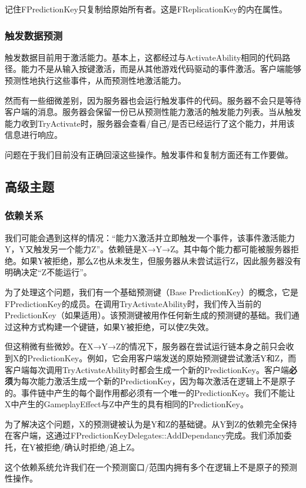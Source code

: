 \documentclass[10pt,CJKmath]{ctexart}
\begin{document}
记住FPredictionKey只复制给原始所有者。这是FReplicationKey的内在属性。

\subsubsection{触发数据预测}
触发数据目前用于激活能力。基本上，这都经过与ActivateAbility相同的代码路径。能力不是从输入按键激活，而是从其他游戏代码驱动的事件激活。客户端能够预测性地执行这些事件，从而预测性地激活能力。

然而有一些细微差别，因为服务器也会运行触发事件的代码。服务器不会只是等待客户端的消息。服务器会保留一份已从预测性能力激活的触发能力列表。当从触发能力收到TryActivate时，服务器会查看/自己/是否已经运行了这个能力，并用该信息进行响应。

问题在于我们目前没有正确回滚这些操作。触发事件和复制方面还有工作要做。

\subsection{高级主题}

\subsubsection{依赖关系}
我们可能会遇到这样的情况：“能力X激活并立即触发一个事件，该事件激活能力Y，Y又触发另一个能力Z”。依赖链是X→Y→Z。其中每个能力都可能被服务器拒绝。如果Y被拒绝，那么Z也从未发生，但服务器从未尝试运行Z，因此服务器没有明确决定“Z不能运行”。

为了处理这个问题，我们有一个基础预测键（Base PredictionKey）的概念，它是FPredictionKey的成员。在调用TryActivateAbility时，我们传入当前的PredictionKey（如果适用）。该预测键被用作任何新生成的预测键的基础。我们通过这种方式构建一个键链，如果Y被拒绝，可以使Z失效。

但这稍微有些微妙。在X→Y→Z的情况下，服务器在尝试运行链本身之前只会收到X的PredictionKey。例如，它会用客户端发送的原始预测键尝试激活Y和Z，而客户端每次调用TryActivateAbility时都会生成一个新的PredictionKey。客户端\textbf{必须}为每次能力激活生成一个新的PredictionKey，因为每次激活在逻辑上不是原子的。事件链中产生的每个副作用都必须有一个唯一的PredictionKey。我们不能让X中产生的GameplayEffect与Z中产生的具有相同的PredictionKey。

为了解决这个问题，X的预测键被认为是Y和Z的基础键。从Y到Z的依赖完全保持在客户端，这通过FPredictionKeyDelegates::AddDependancy完成。我们添加委托，在Y被拒绝/确认时拒绝/追上Z。

这个依赖系统允许我们在一个预测窗口/范围内拥有多个在逻辑上不是原子的预测性操作。
\end{document}
